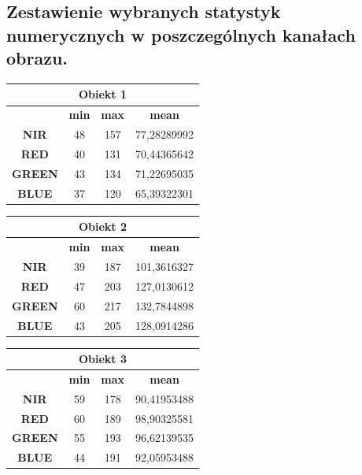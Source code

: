 \documentclass[a4paper,12pt]{article}  %
\begin{document}
\newpage
\subsection{Zestawienie wybranych statystyk numerycznych w poszczególnych kanałach obrazu.}

\begin{table}[h!]
\centering
\begin{tabular}{|c|c|c|c|}
\hline
\multicolumn{4}{|c|}{\textbf{Obiekt 1}} \\ \hline
\textbf{} & \textbf{min} & \textbf{max} & \textbf{mean} \\ \hline
\textbf{NIR} & 48 & 157 & 77,28289992\\ \hline
\textbf{RED} & 40 & 131 & 70,44365642\\ \hline
\textbf{GREEN} & 43 & 134 & 71,22695035\\ \hline
\textbf{BLUE} & 37 & 120 & 65,39322301\\ \hline
\end{tabular}
\end{table}

\begin{table}[h!]
\centering
\begin{tabular}{|c|c|c|c|}
\hline
\multicolumn{4}{|c|}{\textbf{Obiekt 2}} \\ \hline
\textbf{} & \textbf{min} & \textbf{max} & \textbf{mean} \\ \hline
\textbf{NIR} & 39 & 187 & 101,3616327\\ \hline
\textbf{RED} & 47 & 203 & 127,0130612\\ \hline
\textbf{GREEN} & 60 & 217 & 132,7844898\\ \hline
\textbf{BLUE} & 43 & 205 & 128,0914286\\ \hline
\end{tabular}
\end{table}

\begin{table}[h!]
\centering
\begin{tabular}{|c|c|c|c|}
\hline
\multicolumn{4}{|c|}{\textbf{Obiekt 3}} \\ \hline
\textbf{} & \textbf{min} & \textbf{max} & \textbf{mean} \\ \hline
\textbf{NIR} & 59 & 178 & 90,41953488\\ \hline
\textbf{RED} & 60 & 189 & 98,90325581\\ \hline
\textbf{GREEN} & 55 & 193 & 96,62139535\\ \hline
\textbf{BLUE} & 44 & 191 & 92,05953488\\ \hline
\end{tabular}
\end{table}
\end{document}

